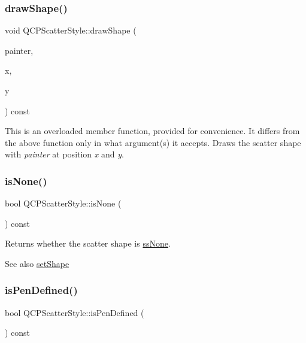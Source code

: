 \subsubsection{\texorpdfstring{drawShape()}{drawShape()}\hspace{0.1cm}{\footnotesize\ttfamily [2/2]}}
{\footnotesize\ttfamily void Q\+C\+P\+Scatter\+Style\+::draw\+Shape (\begin{DoxyParamCaption}\item[{\mbox{\hyperlink{class_q_c_p_painter}{Q\+C\+P\+Painter}} $\ast$}]{painter,  }\item[{double}]{x,  }\item[{double}]{y }\end{DoxyParamCaption}) const}

This is an overloaded member function, provided for convenience. It differs from the above function only in what argument(s) it accepts. Draws the scatter shape with {\itshape painter} at position {\itshape x} and {\itshape y}. \mbox{\label{class_q_c_p_scatter_style_a72db6bcb1e1abd6e53c1315dd3dea7e4}} 
\subsubsection{\texorpdfstring{isNone()}{isNone()}}
{\footnotesize\ttfamily bool Q\+C\+P\+Scatter\+Style\+::is\+None (\begin{DoxyParamCaption}{ }\end{DoxyParamCaption}) const\hspace{0.3cm}{\ttfamily [inline]}}

Returns whether the scatter shape is \mbox{\hyperlink{class_q_c_p_scatter_style_adb31525af6b680e6f1b7472e43859349abd144c291ca274f77053ec68cab6c022}{ss\+None}}.

\begin{DoxySeeAlso}{See also}
\mbox{\hyperlink{class_q_c_p_scatter_style_a7c641c4d4c6d29cb705d3887cfce91c1}{set\+Shape}} 
\end{DoxySeeAlso}
\mbox{\label{class_q_c_p_scatter_style_a47077eb6450fe9a788f833e4ec1b1d5a}} 
\subsubsection{\texorpdfstring{isPenDefined()}{isPenDefined()}}
{\footnotesize\ttfamily bool Q\+C\+P\+Scatter\+Style\+::is\+Pen\+Defined (\begin{DoxyParamCaption}{ }\end{DoxyParamCaption}) const\hspace{0.3cm}{\ttfamily [inline]}}

